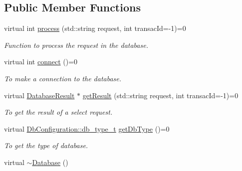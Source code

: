 \subsection*{Public Member Functions}
\begin{DoxyCompactItemize}
\item 
virtual int \hyperlink{classDatabase_a528eb90161e789d75c98415b8df58907}{process} (std::string request, int transacId=-\/1)=0
\begin{DoxyCompactList}\small\item\em Function to process the request in the database. \item\end{DoxyCompactList}\item 
virtual int \hyperlink{classDatabase_aed0ada648871f841cfbe08bc1ee1bf92}{connect} ()=0
\begin{DoxyCompactList}\small\item\em To make a connection to the database. \item\end{DoxyCompactList}\item 
virtual \hyperlink{classDatabaseResult}{DatabaseResult} $\ast$ \hyperlink{classDatabase_a4b87b83ddfcac9d2bbebf3805da602c2}{getResult} (std::string request, int transacId=-\/1)=0
\begin{DoxyCompactList}\small\item\em To get the result of a select request. \item\end{DoxyCompactList}\item 
virtual \hyperlink{classDbConfiguration_a4a57e43a5017a5c4833a784a994c91cf}{DbConfiguration::db\_\-type\_\-t} \hyperlink{classDatabase_a668ffe571cb0f9f355a2f874e40cb515}{getDbType} ()=0
\begin{DoxyCompactList}\small\item\em To get the type of database. \item\end{DoxyCompactList}\item 
\hypertarget{classDatabase_a84d399a2ad58d69daab9b05330e1316d}{
virtual \hyperlink{classDatabase_a84d399a2ad58d69daab9b05330e1316d}{$\sim$Database} ()}
\label{classDatabase_a84d399a2ad58d69daab9b05330e1316d}


\end{DoxyCompactItemize}
